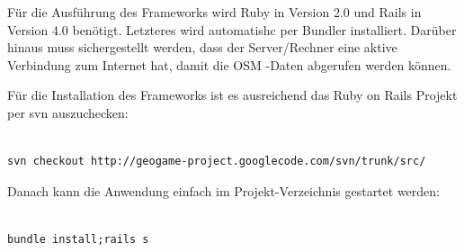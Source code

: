 Für die Ausführung des Frameworks wird Ruby in Version 2.0 und Rails in Version 4.0 benötigt. Letzteres wird automatishc per Bundler installiert.
Darüber hinaus muss sichergestellt werden, dass der Server/Rechner eine aktive Verbindung zum Internet hat, damit die OSM -Daten abgerufen werden können.

Für die Installation des Frameworks ist es ausreichend das Ruby on Rails Projekt per svn auszuchecken:\\\\

\lstset{
   language=Bash
}

\begin{lstlisting}[caption=CLI-Befehl für Code Checkout, label=code:ch8:bash01]
svn checkout http://geogame-project.googlecode.com/svn/trunk/src/
\end{lstlisting}

Danach kann die Anwendung einfach im Projekt-Verzeichnis gestartet werden:\\\\

\begin{lstlisting}[caption=CLI-Befehl für Start des Frameworks, label=code:ch8:bash02]
bundle install;rails s
\end{lstlisting}